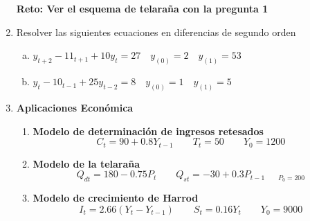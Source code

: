 \documentclass[11pt,a4paper]{article}
\begin{document}
\begin{enumerate}
\begin{multicols}{2}
\begin{enumerate}[a)]
				\end{enumerate}
			\end{multicols}
			\textbf{Reto: Ver el esquema de telaraña con la pregunta 1}
		\item Resolver las siguientes ecuaciones en diferencias de segundo orden
				\begin{enumerate}[a)]
					\item $y_{t+2}-11_{t+1}+10y_{t}=27 \quad y_{(0)}=2 \quad y_{(1)} = 53$ %
					\item $y_{t}-10_{t-1}+25y_{t-2}=8 \quad y_{(0)}=1 \quad y_{(1)} = 5$ %
				\end{enumerate}
		\item \textbf{Aplicaciones Económica}
			\begin{enumerate}
				\item \textbf{Modelo de determinación de ingresos retesados}
					$$C_t=90+0.8Y_{t-1} \qquad T_t=50 \qquad Y_0 = 1200$$
				\item \textbf{Modelo de la telaraña}
					$$Q_{dt}=180-0.75P_t \qquad Q_{st}=-30+0.3P_{t-1 \qquad P_0=200}$$
				\item \textbf{Modelo de crecimiento de Harrod}
					$$I_t=2.66(Y_t-Y_{t-1}) \qquad S_t = 0.16Y_t \qquad Y_0=9000$$
			\end{enumerate}
\end{enumerate}
\end{document}
